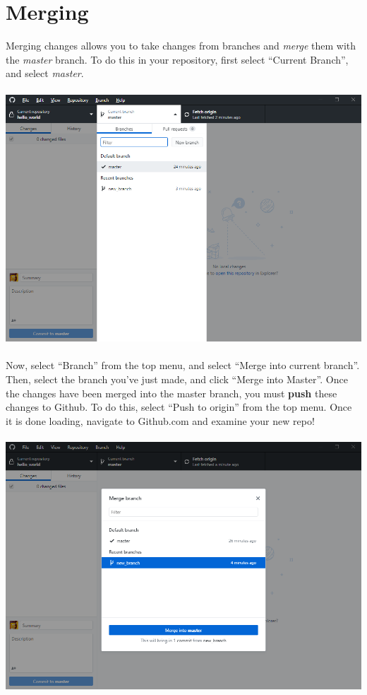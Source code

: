 \documentclass[12pt, letter]{article}
\begin{document}
    \section{Merging}
    Merging changes allows you to take changes from branches and \emph{merge} them with the \emph{master} branch. To do this in your repository, first select ``Current Branch'', and select \emph{master}. \\ \\ %
    \includegraphics{screenshots/shot9.bmp}
    \\ \\
    Now, select ``Branch'' from the top menu, and select ``Merge into current branch''. Then, select the branch you've just made, and click ``Merge into Master''. Once the changes have been merged into the master branch, you must \textbf{push} these changes to Github. To do this, select ``Push to origin'' from the top menu. Once it is done loading, navigate to Github.com and examine your new repo! \\ \\ %
    \includegraphics{screenshots/shot10.bmp} \\ \\
\end{document}
